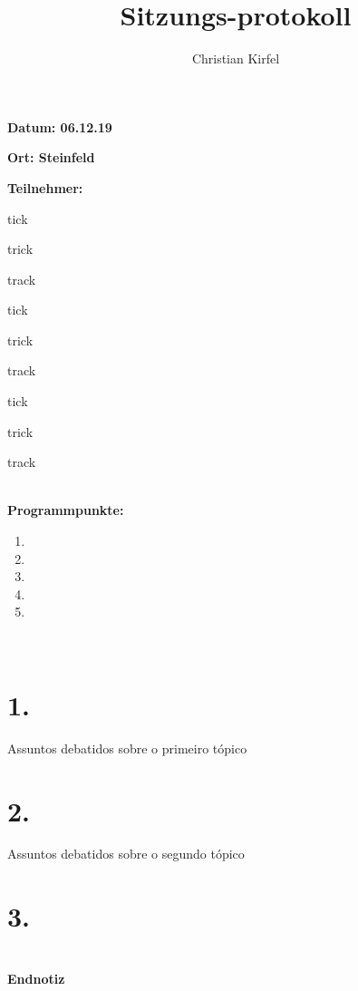 \documentclass[a4paper, 11pt]{article}
\title{Sitzungs-protokoll}
\author{Christian Kirfel}
\begin{document}
\pagestyle{style1}

\textbf{Datum: 06.12.19} %

\textbf{Ort: Steinfeld} %

\textbf{Teilnehmer:} %
\begin{description}
\item tick
\item trick 
\item track
\item tick
\item trick 
\item track
\item tick
\item trick 
\item track
\end{description}

\makebox[\linewidth]{\rule{\linewidth}{0.4pt}}\\
\textbf{Programmpunkte:} 
\begin{enumerate}
\item 
\item
\item
\item
\item
\end{enumerate}
\makebox[\linewidth]{\rule{\linewidth}{0.4pt}}\\

\section*{1.}
Assuntos debatidos sobre o primeiro tópico
\section*{2. }
Assuntos debatidos sobre o segundo tópico

\section*{3.}
 
 \section*{}
\textbf{Endnotiz}
\end{document}
